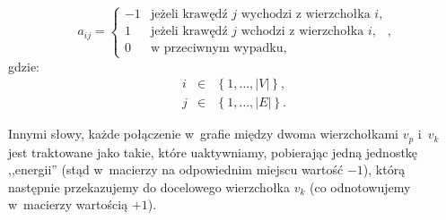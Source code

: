 \begin{equation}
	a_{ij}= \left\{ 
	\begin{array}{ll}
	-1 & \textrm{jeżeli krawędź $j$ wychodzi z~wierzchołka $i$,}\\
	1 & \textrm{jeżeli krawędź $j$ wchodzi z~wierzchołka $i$,}\\
	0 & \textrm{w przeciwnym wypadku,}
	\end{array} \right.\textrm{,}
\end{equation}
gdzie:
\begin{equation}
	\begin{array}{lll}
	i & \in & \left\{ 1, \dots, \left| V \right| \right\} \textrm{,} \\
	j & \in & \left\{ 1, \dots, \left| E \right| \right\} \textrm{.}
	\end{array}
\end{equation}

Innymi słowy, każde połączenie w~grafie między dwoma wierzchołkami $v_{p}$ i~$v_{k}$ jest traktowane jako takie, które uaktywniamy, pobierając jedną jednostkę ,,energii'' (stąd w~macierzy na odpowiednim miejscu wartość $-1$), którą następnie przekazujemy do docelowego wierzchołka $v_{k}$ (co odnotowujemy w~macierzy wartością $+1$).

